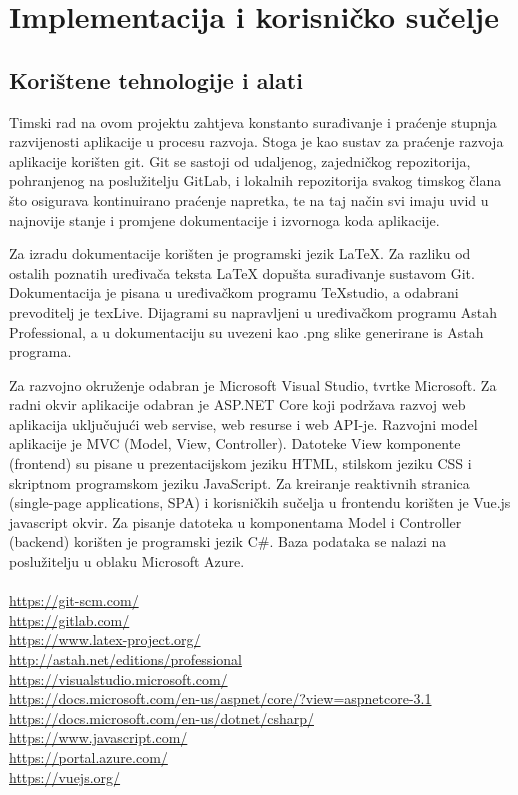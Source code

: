 \chapter{Implementacija i korisničko sučelje}
		
		
		\section{Korištene tehnologije i alati}
			
			\textnormal{
			Timski rad na ovom projektu zahtjeva konstanto surađivanje i praćenje
			stupnja razvijenosti aplikacije u procesu razvoja. Stoga je kao sustav za praćenje razvoja aplikacije korišten git. Git se sastoji od udaljenog, zajedničkog repozitorija, pohranjenog na poslužitelju GitLab, i lokalnih repozitorija svakog timskog člana što osigurava kontinuirano praćenje napretka, te na taj način svi imaju uvid u najnovije stanje i promjene dokumentacije i izvornoga koda aplikacije.}
		
			\smallbreak
			
			\textnormal{
			Za izradu dokumentacije korišten je programski jezik LaTeX. Za
			razliku od ostalih poznatih uređivača teksta LaTeX dopušta surađivanje sustavom Git. Dokumentacija je pisana u uređivačkom programu TeXstudio, a odabrani prevoditelj je texLive. Dijagrami su napravljeni u uređivačkom programu Astah Professional, a u dokumentaciju su uvezeni kao .png slike generirane is Astah programa.}
		
			\smallbreak
			
			\textnormal{
			Za razvojno okruženje odabran je Microsoft Visual Studio, tvrtke
			Microsoft. Za radni okvir aplikacije odabran je ASP.NET Core koji podržava razvoj web aplikacija uključujući web servise, web resurse i web API-je. Razvojni model aplikacije je MVC (Model, View, Controller).
			Datoteke View komponente (frontend) su pisane u prezentacijskom jeziku HTML, stilskom jeziku CSS i skriptnom programskom jeziku JavaScript.
			Za kreiranje reaktivnih stranica (single-page applications, SPA) i korisničkih sučelja u frontendu korišten je Vue.js javascript okvir.
			Za pisanje datoteka u komponentama Model i Controller (backend) korišten je programski jezik C\#.
			Baza podataka se nalazi na poslužitelju u oblaku Microsoft Azure.\\
			\\
			\url{https://git-scm.com/}\\
			\url{https://gitlab.com/}\\
			\url{https://www.latex-project.org/}\\
			\url{http://astah.net/editions/professional}\\
			\url{https://visualstudio.microsoft.com/}\\
			\url{https://docs.microsoft.com/en-us/aspnet/core/?view=aspnetcore-3.1}\\
			\url{https://docs.microsoft.com/en-us/dotnet/csharp/}\\
			\url{https://www.javascript.com/}\\
			\url{https://portal.azure.com/}\\
			\url{https://vuejs.org/}}
			
